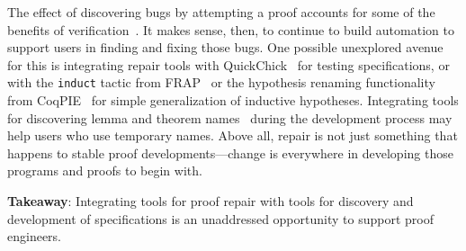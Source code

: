 The effect of discovering bugs by attempting a proof accounts for some
of the benefits of verification~\cite{murraybp}.
It makes sense, then, to continue to build automation to support users
in finding and fixing those bugs.
One possible unexplored avenue for this is integrating repair tools
with QuickChick~\cite{Paraskevopoulou2015} for testing specifications,
or with the \lstinline{induct} tactic from FRAP~\cite{FRAPBook}
or the hypothesis renaming functionality from CoqPIE~\cite{Roe2016}
for simple generalization of inductive hypotheses.
Integrating tools for discovering lemma and theorem names~\cite{Aspinall2016b}
during the development process may help users who use temporary names.
Above all, repair is not just something that happens to stable proof
developments---change is everywhere in developing those programs and
proofs to begin with.

\begin{displayquote}
  \textbf{Takeaway}: Integrating tools for proof repair with tools
  for discovery and development of specifications
  is an unaddressed opportunity to support proof engineers.
\end{displayquote}
